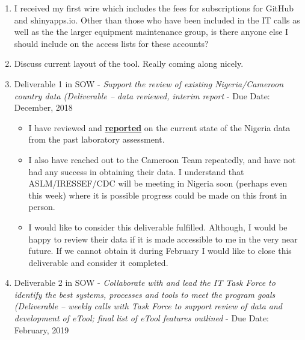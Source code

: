 \documentclass[]{article}
\providecommand{\tightlist}{%
  \setlength{\itemsep}{0pt}\setlength{\parskip}{0pt}}
\begin{document}
\begin{enumerate}
\def\labelenumi{\arabic{enumi}.}
\tightlist
\item
  I received my first wire which includes the fees for subscriptions for
  GitHub and shinyapps.io. Other than those who have been included in
  the IT calls as well as the the larger equipment maintenance group, is
  there anyone else I should include on the access lists for these
  accounts?
\item
  Discuss current layout of the tool. Really coming along nicely.
\item
  Deliverable 1 in SOW - \emph{Support the review of existing
  Nigeria/Cameroon country data (Deliverable -- data reviewed, interim
  report} - Due Date: December, 2018

  \begin{itemize}
  \tightlist
  \item
    I have reviewed and
    \textbf{\href{https://github.com/paceafenet/etool_dev/blob/master/existing_lab_data_exploration.md}{reported}}
    on the current state of the Nigeria data from the past laboratory
    assessment.
  \item
    I also have reached out to the Cameroon Team repeatedly, and have
    not had any success in obtaining their data. I understand that
    ASLM/IRESSEF/CDC will be meeting in Nigeria soon (perhaps even this
    week) where it is possible progress could be made on this front in
    person.
  \item
    I would like to consider this deliverable fulfilled. Although, I
    would be happy to review their data if it is made accessible to me
    in the very near future. If we cannot obtain it during February I
    would like to close this deliverable and consider it completed.
  \end{itemize}
\item
  Deliverable 2 in SOW - \emph{Collaborate with and lead the IT Task
  Force to identify the best systems, processes and tools to meet the
  program goals (Deliverable -- weekly calls with Task Force to support
  review of data and development of eTool; final list of eTool features
  outlined} - Due Date: February, 2019


\end{enumerate}
\end{document}
